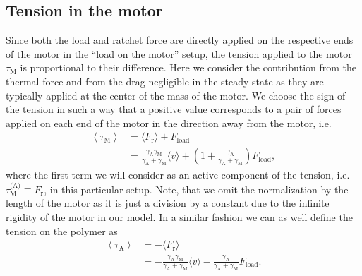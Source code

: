 \documentclass[aps,pre,twocolumn,showpacs,showkeys,superscriptaddress,floatfix]{revtex4-1}
\begin{document}
\subsection{Tension in the motor}
\label{sec:tension_motor}
Since both the load and ratchet force are directly applied on the respective ends of the motor in the ``load on the motor'' setup, 
the tension applied to the motor $\tau_\text{M}$ is proportional to their difference.
Here we consider the contribution from the thermal force and from the drag negligible in the steady state as they are typically applied at the center of the mass of the motor. 
We choose the sign of the tension in such a way 
that a positive value corresponds to a pair of forces applied on each end of the motor in the direction away from the motor,
i.e.  
\begin{align}
\left\langle \tau_\text{M} \right\rangle 
&= \langle F_\text{r} \rangle + F_\text{load} \nonumber \\
&= \frac{\gamma_\text{A}\gamma_\text{M}}{\gamma_\text{A}+\gamma_\text{M}}\langle v\rangle 
+ \left(1 + \frac{\gamma_\text{A}}{\gamma_\text{A}+\gamma_\text{M}} \right) F_\text{load},
\label{eq:tension}
\end{align}
where the first term we will consider as an active component of the tension, i.e. $\tau_\text{M}^\text{(A)} \equiv F_\text{r}$, in this particular setup. 
Note, that we omit the normalization by the length of the motor as it is just a division by a constant due to the infinite rigidity of the motor in our model.   
In a similar fashion we can as well define the tension on the polymer as
\begin{align}
\left\langle \tau_\text{A} \right\rangle 
&= - \langle F_\text{r} \rangle \nonumber \\
&= - \frac{\gamma_\text{A}\gamma_\text{M}}{\gamma_\text{A}+\gamma_\text{M}}\langle v\rangle 
- \frac{\gamma_\text{A}}{\gamma_\text{A}+\gamma_\text{M}} F_\text{load}.
\label{eq:tension_on_polymer}
\end{align}
\end{document}
